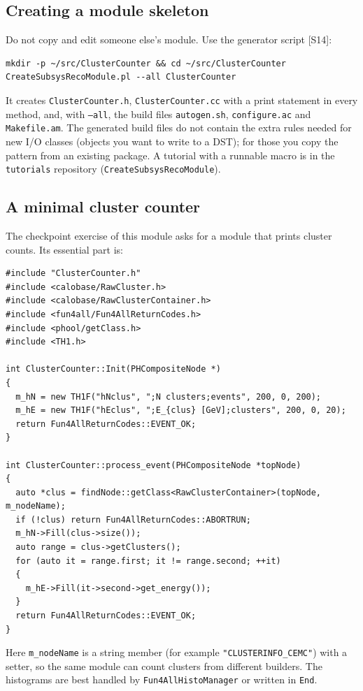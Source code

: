 \documentclass[11pt,letterpaper]{article}
\begin{document}
\subsection{Creating a module skeleton}
Do not copy and edit someone else's module. Use the generator script [S14]:
{\footnotesize\begin{verbatim}
mkdir -p ~/src/ClusterCounter && cd ~/src/ClusterCounter
CreateSubsysRecoModule.pl --all ClusterCounter
\end{verbatim}}
It creates \texttt{ClusterCounter.h}, \texttt{ClusterCounter.cc} with a print statement in every method, and, with \texttt{--all},
the build files \texttt{autogen.sh}, \texttt{configure.ac} and \texttt{Makefile.am}.
The generated build files do not contain the extra rules needed for new I/O classes (objects you want to write to a DST); for those you copy the pattern from an existing package.
A tutorial with a runnable macro is in the \texttt{tutorials} repository (\texttt{CreateSubsysRecoModule}).

\subsection{A minimal cluster counter}
The checkpoint exercise of this module asks for a module that prints cluster counts. Its essential part is:
{\footnotesize\begin{verbatim}
#include "ClusterCounter.h"
#include <calobase/RawCluster.h>
#include <calobase/RawClusterContainer.h>
#include <fun4all/Fun4AllReturnCodes.h>
#include <phool/getClass.h>
#include <TH1.h>

int ClusterCounter::Init(PHCompositeNode *)
{
  m_hN = new TH1F("hNclus", ";N clusters;events", 200, 0, 200);
  m_hE = new TH1F("hEclus", ";E_{clus} [GeV];clusters", 200, 0, 20);
  return Fun4AllReturnCodes::EVENT_OK;
}

int ClusterCounter::process_event(PHCompositeNode *topNode)
{
  auto *clus = findNode::getClass<RawClusterContainer>(topNode, m_nodeName);
  if (!clus) return Fun4AllReturnCodes::ABORTRUN;
  m_hN->Fill(clus->size());
  auto range = clus->getClusters();
  for (auto it = range.first; it != range.second; ++it)
  {
    m_hE->Fill(it->second->get_energy());
  }
  return Fun4AllReturnCodes::EVENT_OK;
}
\end{verbatim}}
Here \texttt{m\_nodeName} is a string member (for example \texttt{"CLUSTERINFO\_CEMC"}) with a setter, so the same module can count clusters from different builders.
The histograms are best handled by \texttt{Fun4AllHistoManager} or written in \texttt{End}.
\end{document}
